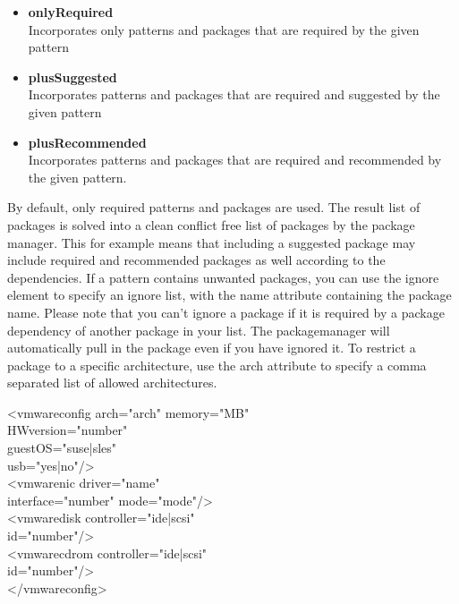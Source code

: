 \begin{itemize}
\item \textbf{onlyRequired}\\
      Incorporates only patterns and packages that are required by the
      given pattern
\item \textbf{plusSuggested}\\
      Incorporates patterns and packages that are required
      and suggested by the given pattern
\item \textbf{plusRecommended}\\
      Incorporates patterns and packages that are required and
      recommended by the given pattern.
\end{itemize}

By default, only required patterns and packages are used. The result
list of packages is solved into a clean conflict free list of packages
by the package manager. This for example means that including a suggested
package may include required and recommended packages as well according
to the dependencies. If a pattern contains unwanted packages, you can use
the ignore element to specify an ignore list, with the name attribute
containing the package name. Please note that you can't ignore a package
if it is required by a package dependency of another package in your list.
The packagemanager will automatically pull in the package even if you have
ignored it. To restrict a package to a specific architecture, use
the arch attribute to specify a comma separated list of allowed
architectures.

\begin{Command}{12cm}
<vmwareconfig arch="arch" memory="MB"\\
\hspace*{2.5cm}HWversion="number"\\
\hspace*{2.5cm}guestOS="suse|sles"\\
\hspace*{2.5cm}usb="yes|no"/>\\
\hspace*{1cm}<vmwarenic driver="name"\\
\hspace*{2.5cm}interface="number" mode="mode"/>\\
\hspace*{1cm}<vmwaredisk controller="ide|scsi"\\
\hspace*{2.5cm}id="number"/>\\
\hspace*{1cm}<vmwarecdrom controller="ide|scsi"\\
\hspace*{2.5cm}id="number"/>\\
</vmwareconfig>
\end{Command}

